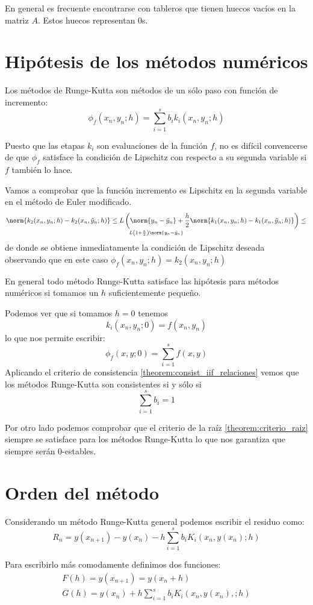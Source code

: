 \obs En general es frecuente encontrarse con tableros que tienen huecos vacíos en la matriz $A$. Estos huecos representan 0s.

\section{Hipótesis de los métodos numéricos}

Los métodos de Runge-Kutta son métodos de un sólo paso con función de incremento:
\[\phi_f(x_n,y_n;h) = \sum_{i=1}^sb_ik_i(x_n,y_n;h)\]

Puesto que las etapas $k_i$ son evaluaciones de la función $f$, no es difícil convencerse de que $\phi_f$ satisface la condición de Lipschitz con respecto a su segunda variable si $f$ también lo hace.

\begin{example}
Vamos a comprobar que la función incremento es Lipschitz en la segunda variable en el método de Euler modificado.
\[\norm{k_2(x_n,y_n;h)-k_2(x_n,\tilde{y}_n;h)} \leq L\left( \norm{y_n-\tilde{y}_n}+\frac{h}{2}\norm{k_1(x_n,y_n;h)-k_1(x_n,\tilde{y}_n;h)}\right) \leq \atop L\left(1+\frac{h}{2}\right) \norm{y_n-\tilde{y}_n}\]
de donde se obtiene inmediatamente la condición de Lipschitz deseada observando que en este caso $\phi_f(x_n,y_n;h)=k_2(x_n,y_n;h)$
\end{example}

\obs En general todo método Runge-Kutta satisface las hipótesis para métodos numéricos si tomamos un $h$ suficientemente pequeño.

Podemos ver que si tomamos $h=0$ tenemos
\[k_i(x_n,y_n;0)=f(x_n,y_n)\]
lo que nos permite escribir:
\[\phi_f(x,y;0)=\sum_{i=1}^sf(x,y)\]
Aplicando el criterio de consistencia \ref{theorem:consist_iif_relaciones} vemos que los métodos Runge-Kutta son consistentes si y sólo si
\[\sum_{i=1}^sb_i = 1\]

Por otro lado podemos comprobar que el criterio de la raíz \ref{theorem:criterio_raiz} siempre se satisface para los métodos Runge-Kutta lo que nos garantiza que siempre serán 0-estables.

\section{Orden del método}
Considerando un método Runge-Kutta general podemos escribir el residuo como:
\[R_n = y(x_{n+1})-y(x_n)-h \sum_{i=1}^sb_iK_i(x_n,y(x_n);h)\]

Para escribirlo más comodamente definimos dos funciones:
\[\begin{array}{l}
F(h) = y(x_{n+1}) = y(x_n+h)\\
G(h) = y(x_n)+h \sum_{i=1}^sb_iK_i(x_n,y(x_n),;h)
\end{array}\]

